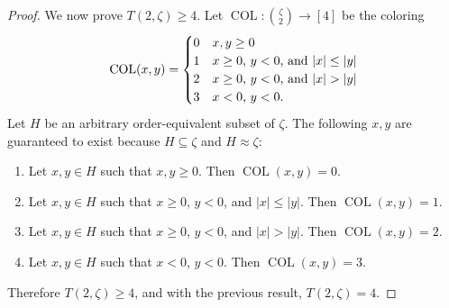\documentclass[10pt,a4paper]{article}
\newcommand{\oequiv}{\approx}
\newcommand{\COL}{\operatorname{COL}}
\theoremstyle{plain}
\theoremstyle{definition}
\begin{document}
\begin{proof}
We now prove $T(2,\zeta)\geq 4$. Let $\COL\colon\binom{\zeta}{2}\to [4]$ be the coloring
\begin{align*}
\COL(x,y)=
\begin{cases}
0 & \text{$x,y\geq 0$} \cr
1 & \text{$x\geq 0$, $y<0$, and $|x|\leq |y|$} \cr
2 & \text{$x\geq 0$, $y<0$, and $|x|> |y|$} \cr
3 & \text{$x<0$, $y<0$.} \cr
\end{cases}
\end{align*}
Let $H$ be an arbitrary order-equivalent subset of $\zeta.$
The following $x,y$ are guaranteed to exist because $H \subseteq \zeta$ and $H \oequiv \zeta$:
\begin{enumerate} %
\item
Let $x,y\in H$ such that $x,y\ge 0$. Then $\COL(x,y)=0$. 
\item
Let $x,y\in H$ such that $x\ge 0$, $y<0$, and $|x|\le |y|$. Then $\COL(x,y)=1$. 
\item 
Let $x,y\in H$ such that $x\ge 0$, $y<0$, and $|x|>|y|$. Then $\COL(x,y)=2$. 
\item
Let $x,y\in H$ such that $x<0$, $y<0$. Then $\COL(x,y)=3$. 
\end{enumerate}  %
Therefore $T(2,\zeta)\geq 4$, and with the previous result, $T(2,\zeta) = 4$.
\end{proof}
\end{document}
